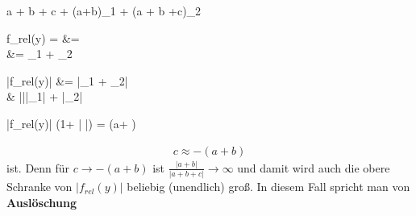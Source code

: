 \documentclass[13pt]{scrreprt}
\begin{document}
\begin{abox}{25}
	 \overset{\cdot}{=}  a + b + c + (a+b)\cdot\epsilon_1 + (a + b +c)\cdot\epsilon_2
\end{abox}

\begin{abox}{26}
	f_{rel}(y) =  &= \\
	&= \cdot\epsilon_1 + \epsilon_2
\end{abox}

\begin{abox}{27}
	|f_{rel}(y)| &= |\cdot\epsilon_1 + \epsilon_2|\\ & ||\cdot|\epsilon_1| + |\epsilon_2|
\end{abox}

\begin{abox}{28}
	|f_{rel}(y)| \leqslant (1+ | |) \cdot \epsilon = (a+ ) \cdot \epsilon
\end{abox}

\begin{tbox}{29}
	\begin{align*}
	c \approx -(a+b)
	\end{align*}
	ist. Denn für $c \rightarrow -(a+b)$ ist $ \frac{|a+b|}{|a+b+c|} \rightarrow \infty$ und damit wird auch die obere Schranke von $|f_{rel}(y)|$ beliebig (unendlich) groß. In diesem Fall spricht man von \textbf{Auslöschung}
\end{tbox}
\end{document}
